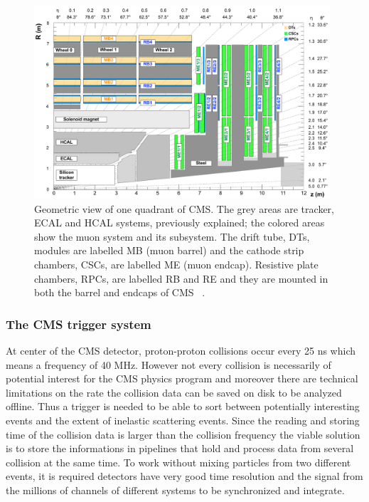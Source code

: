 \begin{figure}[h]
\centering
\includegraphics[width=0.98\textwidth]{Figures/c2/cms_quadrant_run_ii.pdf}
\caption{Geometric view of one quadrant of CMS. The grey areas are
  tracker, ECAL and HCAL systems, previously explained; the colored
  areas show the muon system and its subsystem. The drift tube, DTs,
  modules are labelled MB (muon barrel) and the cathode strip
  chambers, CSCs, are labelled ME (muon endcap). Resistive plate
  chambers, RPCs, are labelled RB and RE and they are mounted in both the barrel and endcaps of CMS
~\cite{muonsystemPU}. }
\label{fig:muonsystem}
\end{figure} 

\subsubsection{The CMS trigger system}\label{sec:triggersystem}

At center of the CMS detector, proton-proton collisions occur every
25 ns which means a frequency of 40 MHz. However not every collision is
necessarily of potential interest for the CMS physics program and
moreover there are technical limitations on the rate the collision data can be
saved on disk to be analyzed offline. Thus a trigger is needed to be
able to sort between potentially interesting events and the extent of
inelastic scattering events.
Since the reading and storing time of the collision data is larger
than the collision frequency the viable solution is
to store the informations in pipelines that hold and process data
from several collision at the same time.
To work without mixing particles from two different events, it is
required detectors have very good time
resolution and the signal from the millions of channels of different
systems to be synchronized and integrate.

